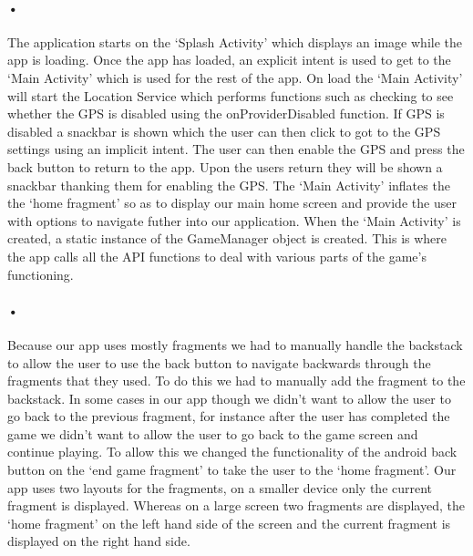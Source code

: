 \documentclass[10pt, a4paper]{article}
\begin{document}
\paragraph*{•}
The application starts on the `Splash Activity' which displays an image while the app is loading. Once the app has loaded, an explicit intent is used to get to the `Main Activity' which is used for the rest of the app. On load the `Main Activity' will start the Location Service which performs functions such as checking to see whether the GPS is disabled using the onProviderDisabled function. If GPS is disabled a snackbar is shown which the user can then click to got to the GPS settings using an implicit intent. The user can then enable the GPS and press the back button to return to the app. Upon the users return they will be shown a snackbar thanking them for enabling the GPS. The `Main Activity' inflates the the `home fragment' so as to display our main home screen and provide the user with options to navigate futher into our application. When the `Main Activity' is created, a static instance of the GameManager object is created. This is where the app calls all the API functions to deal with various parts of the game's functioning.

\paragraph*{•}
Because our app uses mostly fragments we had to manually handle the backstack to allow the user to use the back button to navigate backwards through the fragments that they used. To do this we had to manually add the fragment to the backstack. In some cases in our app though we didn't want to allow the user to go back to the previous fragment, for instance after the user has completed the game we didn't want to allow the user to go back to the game screen and continue playing. To allow this we changed the functionality of the android back button on the `end game fragment' to take the user to the `home fragment'. Our app uses two layouts for the fragments, on a smaller device only the current fragment is displayed. Whereas on a large screen two fragments are displayed, the `home fragment' on the left hand side of the screen and the current fragment is displayed on the right hand side.
\end{document}
